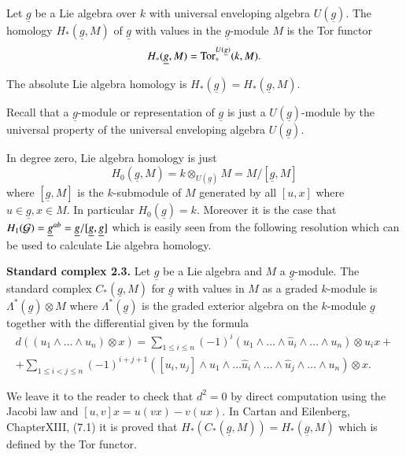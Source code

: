 \begin{definition}\label{chap4-defi2.1}
Let $\underline{g}$ be a Lie algebra over $k$ with universal
enveloping algebra $U(\underline{g})$. The homology
$H_{\ast}(\underline{g},M)$ of $\underline{g}$ with values in the
$\underline{g}$-module $M$ is the Tor functor
$$
H_{\ast}(\underline{g},M)=\operatorname{Tor}^{U(\underline{g})}_{\ast}(k,M).
$$

The absolute Lie algebra homology is
$H_{\ast}(\underline{g})=H_{\ast}(\underline{g},M)$. 

Recall that a $\underline{g}$-module or representation of
$\underline{g}$ is just a $U(\underline{g})$-module by the universal
property of the universal enveloping algebra $U(\underline{g})$. 
\end{definition}

\begin{remark}\label{chap4-rem2.2}
In degree zero, Lie algebra homology is just
$$
H_{0}(\underline{g},M)=k\otimes_{U(\underline{g})}M=M/[\underline{g},M]
$$
where $[\underline{g},M]$ is the $k$-submodule of $M$ generated by all
$[u,x]$ where $u\in \underline{g},x\in M$. In particular
$H_{0}(\underline{g})=k$. Moreover it is the case that
$H_{1}(\mathcal{G})=\underline{g}^{ab}=\underline{g}/[\underline{g},\underline{g}]$
which is easily seen from the following resolution which can be used
to calculate Lie algebra homology.
\end{remark}

\noindent
{\bf Standard complex 2.3.} Let $\underline{g}$ be a Lie
algebra and
$M$ a $\underline{g}$-module. The standard complex
$C_{\ast}(\underline{g},M)$ for $\underline{g}$ with values in $M$ as
a graded $k$-module is $\Lambda^{\ast}(\underline{g})\otimes M$ where
$\Lambda^{\ast}(\underline{g})$ is the graded exterior algebra on the
$k$-module $\underline{g}$ together with the differential given by the
formula 
\begin{gather*}
d((u_{1}\wedge\ldots\wedge u_{n})\otimes x)=\sum_{1\leq i\leq
  n}(-1)^{i}(u_{1}\wedge\ldots\wedge \hat{u}_{i}\wedge\ldots\wedge
u_{n})\otimes u_{i}x+\\
+\sum_{1\leq i<j\leq n}(-1)^{i+j+1}([u_{i},u_{j}]\wedge
u_{1}\wedge\ldots \hat{u}_{i}\wedge\ldots\wedge
\hat{u}_{j}\wedge\ldots\wedge u_{n})\otimes x. 
\end{gather*}

We leave it to the reader to check that $d^{2}=0$ by direct
computation using the Jacobi law and $[u,v]x=u(vx)-v(ux)$. In Cartan
and Eilenberg, Chapter\pageoriginale XIII, (7.1) it is proved that
$H_{\ast}(C_{\ast}(\underline{g},M))=H_{\ast}(\underline{g},M)$ which
is defined by the Tor functor.


